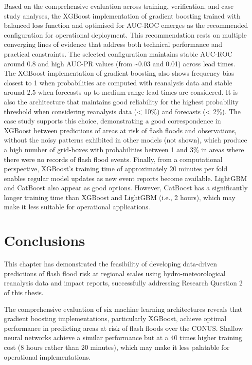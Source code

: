 Based  on the comprehensive evaluation across training, verification, and case study analyses, the XGBoost implementation of gradient boosting trained with balanced loss function and optimised for AUC-ROC emerges as the recommended configuration for operational deployment. This recommendation rests on multiple converging lines of evidence that address both technical performance and practical constraints. The selected configuration maintains stable AUC-ROC around 0.8 and high AUC-PR values (from \sim0.03 and 0.01) across lead times. The XGBoost implementation of gradient boosting also shows frequency bias closest to 1 when probabilities are computed with reanalysis data and stable around 2.5 when forecasts up to medium-range lead times are considered. It is also the architecture that maintains good reliability for the highest probability threshold when considering reanalysis data (< 10\%) and forecasts (< 2\%). The case study supports this choice, demonstrating a good correspondence in XGBoost between predictions of areas at risk of flash floods and observations, without the noisy patterns exhibited in other models (not shown), which produce a high number of grid-boxes with probabilities between 1 and 3\% in areas where there were no records of flash flood events. Finally, from a computational perspective, XGBoost's training time of approximately 20 minutes per fold enables regular model updates as new event reports become available. LightGBM and CatBoost also appear as good options. However, CatBoost has a significantly longer training time than XGBoost and LightGBM (i.e., 2 hours), which may make it less suitable for operational applications.


\section{Conclusions}
\label{data_driven_flash_floods_short_medium_range_conclusions}

This chapter has demonstrated the feasibility of developing data-driven predictions of flash flood risk at regional scales using hydro-meteorological reanalysis data and impact reports, successfully addressing Research Question 2 of this thesis. 

The comprehensive evaluation of six machine learning architectures reveals that gradient boosting implementations, particularly XGBoost, achieve optimal performance in predicting areas at risk of flash floods over the CONUS. Shallow neural networks achieve a similar performance but at a 40 times higher training cost (8 hours rather than 20 minutes), which may make it less palatable for operational implementations. 

